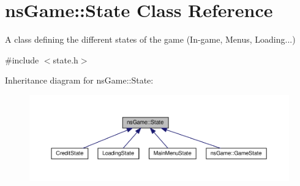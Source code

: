 \hypertarget{structns_game_1_1_state}{}\section{ns\+Game\+:\+:State Class Reference}
\label{structns_game_1_1_state}


A class defining the different states of the game (In-\/game, Menus, Loading...)  




{\ttfamily \#include $<$state.\+h$>$}



Inheritance diagram for ns\+Game\+:\+:State\+:\nopagebreak
\begin{figure}[H]
\begin{center}
\leavevmode
\includegraphics[width=350pt]{structns_game_1_1_state__inherit__graph}
\end{center}
\end{figure}
